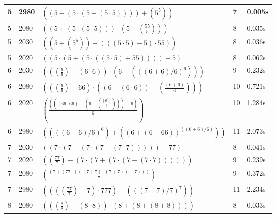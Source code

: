 \documentclass{article}
\theoremstyle{nonumberplain}
\begin{document}
\begin{center}
\begin{longtable}{ | l | l | p{9.5cm} | l | l | }
        5 & 2980 & \( \left(\left(5 - \left(5 \cdot \left(5 + \left(5 \cdot 5\right)\right)\right)\right) + \left({5}^{5}\right)\right) \) & 7 & 0.005s \\\hline
        5 & 2080 & \( \left(\left(5 + \left(5 \cdot \left(5 \cdot 5\right)\right)\right) \cdot \left(5 + \left(\frac{55}{5}\right)\right)\right) \) & 8 & 0.035s \\\hline
        5 & 2030 & \( \left(\left(5 + \left({5}^{5}\right)\right) - \left(\left(\left(5 \cdot 5\right) - 5\right) \cdot 55\right)\right) \) & 8 & 0.036s \\\hline
        5 & 2020 & \( \left(\left(5 \cdot \left(5 + \left(5 \cdot \left(\left(5 \cdot 5\right) + 55\right)\right)\right)\right) - 5\right) \) & 8 & 0.062s \\\hline
        6 & 2030 & \( \left(\left(\left(\frac{6}{6}\right) - \left(6 \cdot 6\right)\right) \cdot \left(6 - \left({((6 + 6) / 6)}^{6}\right)\right)\right) \) & 9 & 0.232s \\\hline
        6 & 2080 & \( \left(\left(\left(\frac{6}{6}\right) - 66\right) \cdot \left(\left(6 - \left(6 \cdot 6\right)\right) - \left(\frac{\left(6 + 6\right)}{6}\right)\right)\right) \) & 10 & 0.721s \\\hline
        6 & 2020 & \( \left(\frac{\left(\left(\left(66 \cdot 66\right) - \left(6 - \left(\frac{\left({6}^{6}\right)}{6}\right)\right)\right) - 6\right)}{6}\right) \) & 10 & 1.284s \\\hline
        6 & 2980 & \( \left(\left({((6 + 6) / 6)}^{6}\right) + \left({(6 + (6 - 66))}^{((6 + 6) / 6)}\right)\right) \) & 11 & 2.073s \\\hline
        7 & 2030 & \( \left(\left(7 \cdot \left(7 - \left(7 \cdot \left(7 - \left(7 \cdot 7\right)\right)\right)\right)\right) - 77\right) \) & 8 & 0.041s \\\hline
        7 & 2020 & \( \left(\left(\frac{77}{7}\right) - \left(7 \cdot \left(7 + \left(7 \cdot \left(7 - \left(7 \cdot 7\right)\right)\right)\right)\right)\right) \) & 9 & 0.239s \\\hline
        7 & 2080 & \( \left(\frac{\left(7 + \left(77 \cdot \left(\left(\left(7 + 7\right) \cdot \left(7 + 7\right)\right) - 7\right)\right)\right)}{7}\right) \) & 9 & 0.372s \\\hline
        7 & 2980 & \( \left(\left(\left(\left(\frac{77}{7}\right) - 7\right) \cdot 777\right) - \left({((7 + 7) / 7)}^{7}\right)\right) \) & 11 & 2.234s \\\hline
        8 & 2080 & \( \left(\left(\left(\frac{8}{8}\right) + \left(8 \cdot 8\right)\right) \cdot \left(8 + \left(8 + \left(8 + 8\right)\right)\right)\right) \) & 8 & 0.033s \\\hline

\end{longtable}
\end{center}
\end{document}
